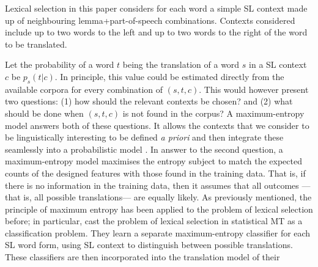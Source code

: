 \documentclass[11pt]{article}
\newcommand{\todofsm}[1]{\renewcommand{\baselinestretch}{0.55}\todo{\scriptsize\sf FSM: #1}\renewcommand{\baselinestretch}{1.0}}
\newcommand{\comment}[1]{\todo{#1}}
\begin{document}
Lexical selection in this paper considers for each word a simple SL
context made up of neighbouring lemma+part-of-speech
combinations. Contexts considered include up to two words to the left
and up to two words to the right of the word to be translated.

Let the probability of a word $t$ being the translation of a word $s$
in a SL context $c$ be $p_s(t|c)$. In principle, this value could be
estimated directly from the available corpora for every combination of
$(s, t, c)$.  This would however present two questions: (1) how should
the relevant contexts be chosen? and (2) what should be done when $(s,
t, c)$ is not found in the corpus?  A maximum-entropy model answers
both of these questions. It allows the contexts that we consider to be
linguistically interesting to be defined \emph{a priori} and then
integrate these seamlessly into a probabilistic model
\citep{Manning99b}.  In answer to the second question, a
maximum-entropy model maximises the entropy subject to match the
expected counts of the designed features with those found in the
training data. %
That is, if there is no information in the training data, then it
assumes that all outcomes ---that is, all possible translations--- are
equally likely.  As previously mentioned, the principle of maximum
entropy has been applied to the problem of lexical selection before;
in particular, \cite{berger1996} cast the problem of lexical selection
in statistical MT as a classification problem. They learn a separate
maximum-entropy classifier for each SL word form,
using SL context to distinguish between possible translations. These
classifiers are then incorporated into the translation model of their
\end{document}
